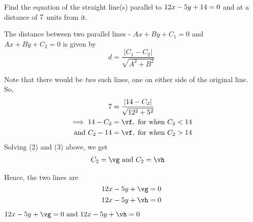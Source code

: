 



\gcalcHypotenuse[0]{\ve}{\va}{\vb}
\MULTIPLY\vd\ve\vf
\SUBTRACT\vc\vf\vg
\ADD\vc\vf\vh

\question[3] Find the equation of the straight line(s) parallel to $12 x - 5 y + 14 = 0$ 
and at a distance of $7$ units from it.

\watchout

\begin{solution}[\halfpage]
	The distance between two parallel lines - $Ax + By + C_1 = 0$ and $Ax+By+C_2 = 0$ is given by 
	\[ d = \dfrac{\vert C_1 - C_2 \vert}{\sqrt{A^2+ B^2}}\]
  
  Note that there would be \textit{two} such lines, 
	one on either side of the original line. So,
	\begin{align}
		\vd &= \dfrac{\vert \vc - C_2 \vert}{\sqrt{\va^2 + \vb^2}} \\
		\implies \vc - C_2 &= \vf, \text{ for when } C_2 < \vc \\
		\text{ and } C_2 - \vc &= \vf, \text{ for when } C_2 > \vc
	\end{align}
	Solving (2) and (3) above, we get 
	\begin{align}
		C_2 &= \vg \text{ and } C_2 = \vh
	\end{align}
	
	Hence, the two lines are 
  \[\va x - \vb y + \vg = 0\] 
  \[\va x - \vb y + \vh = 0\]
\end{solution}

\ifprintanswers
  \begin{codex}
    $\va x -\vb y + \vg = 0\text{ and } \va x - \vb y + \vh = 0$
  \end{codex}
\fi
